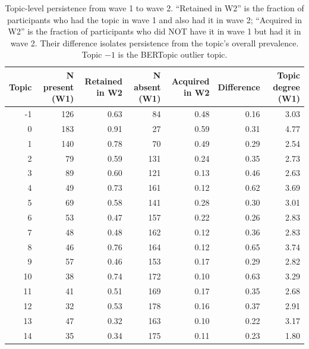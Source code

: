 \begin{table}
\caption{Topic-level persistence from wave 1 to wave 2. ``Retained in W2'' is the fraction of participants who had the topic in wave 1 and also had it in wave 2; ``Acquired in W2'' is the fraction of participants who did NOT have it in wave 1 but had it in wave 2. Their difference isolates persistence from the topic's overall prevalence. Topic $-1$ is the BERTopic outlier topic.}
\label{tab:topic_persistence2}
\begin{tabular}{rrrrrrr}
\toprule
Topic & N present (W1) & Retained in W2 & N absent (W1) & Acquired in W2 & Difference & Topic degree (W1) \\
\midrule
-1 & 126 & 0.63 & 84 & 0.48 & 0.16 & 3.03 \\
0 & 183 & 0.91 & 27 & 0.59 & 0.31 & 4.77 \\
1 & 140 & 0.78 & 70 & 0.49 & 0.29 & 2.54 \\
2 & 79 & 0.59 & 131 & 0.24 & 0.35 & 2.73 \\
3 & 89 & 0.60 & 121 & 0.13 & 0.46 & 2.63 \\
4 & 49 & 0.73 & 161 & 0.12 & 0.62 & 3.69 \\
5 & 69 & 0.58 & 141 & 0.28 & 0.30 & 3.01 \\
6 & 53 & 0.47 & 157 & 0.22 & 0.26 & 2.83 \\
7 & 48 & 0.48 & 162 & 0.12 & 0.36 & 2.83 \\
8 & 46 & 0.76 & 164 & 0.12 & 0.65 & 3.74 \\
9 & 57 & 0.46 & 153 & 0.17 & 0.29 & 2.82 \\
10 & 38 & 0.74 & 172 & 0.10 & 0.63 & 3.29 \\
11 & 41 & 0.51 & 169 & 0.17 & 0.35 & 2.68 \\
12 & 32 & 0.53 & 178 & 0.16 & 0.37 & 2.91 \\
13 & 47 & 0.32 & 163 & 0.10 & 0.22 & 3.17 \\
14 & 35 & 0.34 & 175 & 0.11 & 0.23 & 1.80 \\
\bottomrule
\end{tabular}
\end{table}
